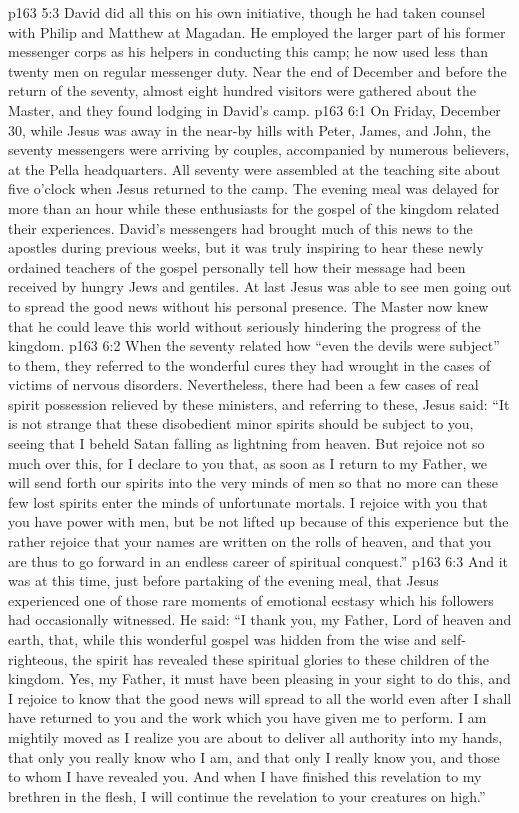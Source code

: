 \vs p163 5:3 David did all this on his own initiative, though he had taken counsel with Philip and Matthew at Magadan. He employed the larger part of his former messenger corps as his helpers in conducting this camp; he now used less than twenty men on regular messenger duty. Near the end of December and before the return of the seventy, almost eight hundred visitors were gathered about the Master, and they found lodging in David’s camp.
\vs p163 6:1 On Friday, December 30, while Jesus was away in the near\hyp{}by hills with Peter, James, and John, the seventy messengers were arriving by couples, accompanied by numerous believers, at the Pella headquarters. All seventy were assembled at the teaching site about five o’clock when Jesus returned to the camp. The evening meal was delayed for more than an hour while these enthusiasts for the gospel of the kingdom related their experiences. David’s messengers had brought much of this news to the apostles during previous weeks, but it was truly inspiring to hear these newly ordained teachers of the gospel personally tell how their message had been received by hungry Jews and gentiles. At last Jesus was able to see men going out to spread the good news without his personal presence. The Master now knew that he could leave this world without seriously hindering the progress of the kingdom.
\vs p163 6:2 When the seventy related how “even the devils were subject” to them, they referred to the wonderful cures they had wrought in the cases of victims of nervous disorders. Nevertheless, there had been a few cases of real spirit possession relieved by these ministers, and referring to these, Jesus said: \textcolor{ubdarkred}{“It is not strange that these disobedient minor spirits should be subject to you, seeing that I beheld Satan falling as lightning from heaven. But rejoice not so much over this, for I declare to you that, as soon as I return to my Father, we will send forth our spirits into the very minds of men so that no more can these few lost spirits enter the minds of unfortunate mortals. I rejoice with you that you have power with men, but be not lifted up because of this experience but the rather rejoice that your names are written on the rolls of heaven, and that you are thus to go forward in an endless career of spiritual conquest.”}
\vs p163 6:3 And it was at this time, just before partaking of the evening meal, that Jesus experienced one of those rare moments of emotional ecstasy which his followers had occasionally witnessed. He said: \textcolor{ubdarkred}{“I thank you, my Father, Lord of heaven and earth, that, while this wonderful gospel was hidden from the wise and self\hyp{}righteous, the spirit has revealed these spiritual glories to these children of the kingdom. Yes, my Father, it must have been pleasing in your sight to do this, and I rejoice to know that the good news will spread to all the world even after I shall have returned to you and the work which you have given me to perform. I am mightily moved as I realize you are about to deliver all authority into my hands, that only you really know who I am, and that only I really know you, and those to whom I have revealed you. And when I have finished this revelation to my brethren in the flesh, I will continue the revelation to your creatures on high.”}
